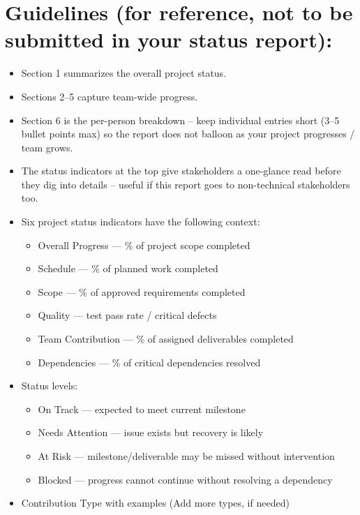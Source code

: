 \documentclass[11pt,a4paper]{article}
\begin{document}
\pagebreak

\section{Guidelines (for reference, not to be submitted in your status report):}

\begin{itemize}
    \item Section 1 summarizes the overall project status.
    \item Sections 2--5 capture team-wide progress.
    \item Section 6 is the per-person breakdown -- keep individual entries short (3--5 bullet points max) so the report does not balloon as your project progresses / team grows.
    \item The status indicators at the top give stakeholders a one-glance read before they dig into details -- useful if this report goes to non-technical stakeholders too.
    \item Six project status indicators have the following context:
    \begin{itemize}
        \item Overall Progress — \% of project scope completed
        \item Schedule — \% of planned work completed
        \item Scope — \% of approved requirements completed
        \item Quality — test pass rate / critical defects
        \item Team Contribution — \% of assigned deliverables completed
        \item Dependencies — \% of critical dependencies resolved
    \end{itemize}
    \item Status levels:
    \begin{itemize}
        \item On Track — expected to meet current milestone
        \item Needs Attention — issue exists but recovery is likely
        \item At Risk — milestone/deliverable may be missed without intervention
        \item Blocked — progress cannot continue without resolving a dependency
    \end{itemize}
    \item Contribution Type with examples (Add more types, if needed)
    \begin{itemize}

\end{itemize}
\end{itemize}
\end{document}
